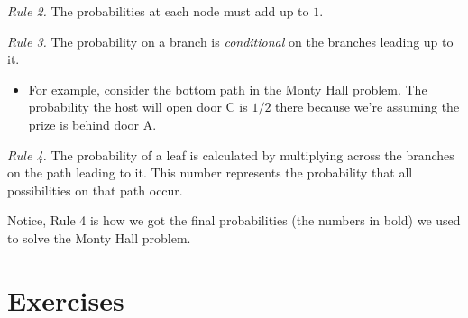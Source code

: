 \documentclass[justified]{tufte-book}
\providecommand{\tightlist}{%
  \setlength{\itemsep}{0pt}\setlength{\parskip}{0pt}}
\theoremstyle{definition}
\theoremstyle{definition}
\theoremstyle{definition}
\theoremstyle{remark}
\begin{document}
\emph{Rule 2.} The probabilities at each node must add up to \(1\).

\emph{Rule 3.} The probability on a branch is \emph{conditional} on the branches leading up to it.

\begin{itemize}
\tightlist
\item
  For example, consider the bottom path in the Monty Hall problem. The probability the host will open door C is \(1/2\) there because we're assuming the prize is behind door A.
\end{itemize}

\emph{Rule 4.} The probability of a leaf is calculated by multiplying across the branches on the path leading to it. This number represents the probability that all possibilities on that path occur.

Notice, Rule 4 is how we got the final probabilities (the numbers in bold) we used to solve the Monty Hall problem.

\hypertarget{exercises}{%
\section*{Exercises}\label{exercises}}
\end{document}
